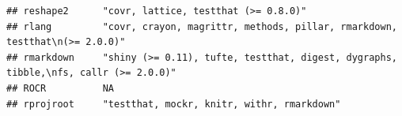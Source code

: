 \documentclass[]{article}
\begin{document}
\begin{verbatim}
## reshape2      "covr, lattice, testthat (>= 0.8.0)"                                                                                                                                                                                                                                                                                                                                                                                                                                                                                                                                                      
## rlang         "covr, crayon, magrittr, methods, pillar, rmarkdown, testthat\n(>= 2.0.0)"                                                                                                                                                                                                                                                                                                                                                                                                                                                                                                                
## rmarkdown     "shiny (>= 0.11), tufte, testthat, digest, dygraphs, tibble,\nfs, callr (>= 2.0.0)"                                                                                                                                                                                                                                                                                                                                                                                                                                                                                                       
## ROCR          NA                                                                                                                                                                                                                                                                                                                                                                                                                                                                                                                                                                                        
## rprojroot     "testthat, mockr, knitr, withr, rmarkdown"                                                                                                                                                                                                                                                                                                                                                                                                                                                                                                                                                

\end{verbatim}
\end{document}

